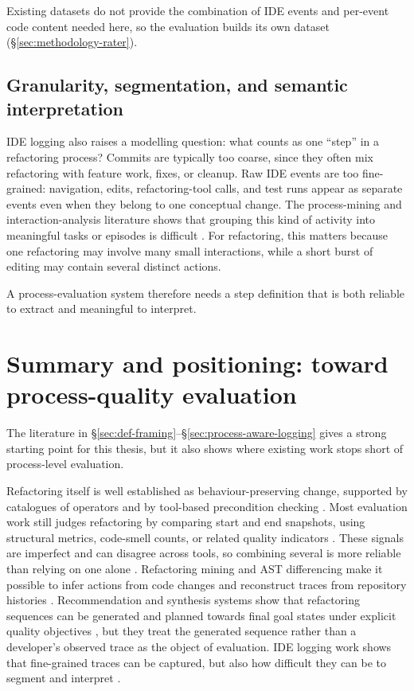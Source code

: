 Existing datasets do not provide the combination of IDE events and per-event code content needed here, so the evaluation builds its own dataset (\S\ref{sec:methodology-rater}).

\subsection{Granularity, segmentation, and semantic interpretation}
IDE logging also raises a modelling question: what counts as one ``step'' in a refactoring process? Commits are typically too coarse, since they often mix refactoring with feature work, fixes, or cleanup. Raw IDE events are too fine-grained: navigation, edits, refactoring-tool calls, and test runs appear as separate events even when they belong to one conceptual change. The process-mining and interaction-analysis literature shows that grouping this kind of activity into meaningful tasks or episodes is difficult \cite{poncin2011processmining,damevski2017usagesmells}. For refactoring, this matters because one refactoring may involve many small interactions, while a short burst of editing may contain several distinct actions.

A process-evaluation system therefore needs a step definition that is both reliable to extract and meaningful to interpret.

\section{Summary and positioning: toward process-quality evaluation}
\label{sec:background-summary}

The literature in \S\ref{sec:def-framing}--\S\ref{sec:process-aware-logging} gives a strong starting point for this thesis, but it also shows where existing work stops short of process-level evaluation.

Refactoring itself is well established as behaviour-preserving change, supported by catalogues of operators and by tool-based precondition checking \cite{opdyke1992refactoring,fowler1999refactoring,mens2004survey}. Most evaluation work still judges refactoring by comparing start and end snapshots, using structural metrics, code-smell counts, or related quality indicators \cite{harman2007pareto,moha2010decor}. These signals are imperfect and can disagree across tools, so combining several is more reliable than relying on one alone \cite{paiva2017evaluation,arcellifontana2016falsepositives,scalabrino2018readability}. Refactoring mining and AST differencing make it possible to infer actions from code changes and reconstruct traces from repository histories \cite{alikhanifard2025rminer,falleri2024gumtree}. Recommendation and synthesis systems show that refactoring sequences can be generated and planned towards final goal states under explicit quality objectives \cite{raychev2013resynth,lin2016navigator,harman2007pareto,mohan2019manyobjective}, but they treat the generated sequence rather than a developer's observed trace as the object of evaluation. IDE logging work shows that fine-grained traces can be captured, but also how difficult they can be to segment and interpret \cite{poncin2011processmining,damevski2017usagesmells,foutsekh2018interactiontraces}.

